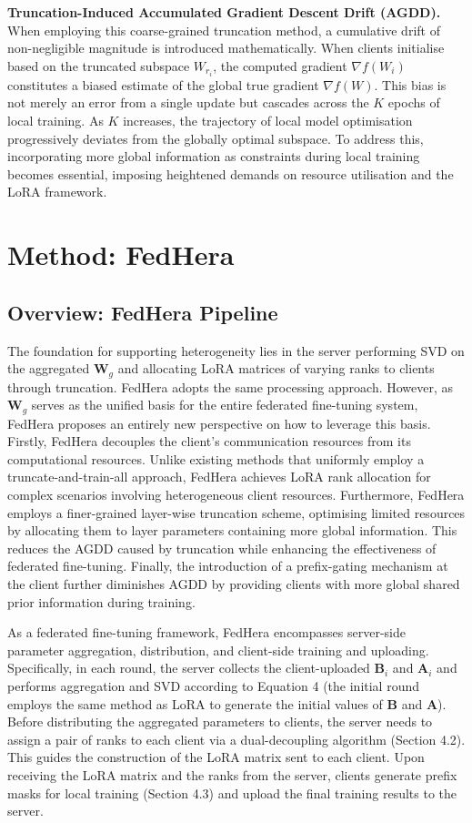 \documentclass{article}
\begin{document}
\textbf{Truncation-Induced Accumulated Gradient Descent Drift (AGDD).} When employing this coarse-grained truncation method, a cumulative drift of non-negligible magnitude is introduced mathematically. When clients initialise based on the truncated subspace $W_{r_i}$, the computed gradient $\nabla f(W_{i})$ constitutes a biased estimate of the global true gradient $\nabla f(W)$. This bias is not merely an error from a single update but cascades across the $K$ epochs of local training. As $K$ increases, the trajectory of local model optimisation progressively deviates from the globally optimal subspace. To address this, incorporating more global information as constraints during local training becomes essential, imposing heightened demands on resource utilisation and the LoRA framework.

\section{Method: FedHera}
\subsection{Overview: FedHera Pipeline}
The foundation for supporting heterogeneity lies in the server performing SVD on the aggregated $\mathbf{W}_{g}$ and allocating LoRA matrices of varying ranks to clients through truncation. FedHera adopts the same processing approach. However, as $\mathbf{W}_{g}$ serves as the unified basis for the entire federated fine-tuning system, FedHera proposes an entirely new perspective on how to leverage this basis. Firstly, FedHera decouples the client's communication resources from its computational resources. Unlike existing methods that uniformly employ a truncate-and-train-all approach, FedHera achieves LoRA rank allocation for complex scenarios involving heterogeneous client resources. Furthermore, FedHera employs a finer-grained layer-wise truncation scheme, optimising limited resources by allocating them to layer parameters containing more global information. This reduces the AGDD caused by truncation while enhancing the effectiveness of federated fine-tuning. Finally, the introduction of a prefix-gating mechanism at the client further diminishes AGDD by providing clients with more global shared prior information during training.

As a federated fine-tuning framework, FedHera encompasses server-side parameter aggregation, distribution, and client-side training and uploading. Specifically, in each round, the server collects the client-uploaded $\mathbf{B}_{i}$ and $\mathbf{A}_{i}$ and performs aggregation and SVD according to Equation 4 (the initial round employs the same method as LoRA to generate the initial values of $\mathbf{B}$ and $\mathbf{A}$). Before distributing the aggregated parameters to clients, the server needs to assign a pair of ranks to each client via a dual-decoupling algorithm (Section 4.2). This guides the construction of the LoRA matrix sent to each client. Upon receiving the LoRA matrix and the ranks from the server, clients generate prefix masks for local training (Section 4.3) and upload the final training results to the server.
\end{document}
